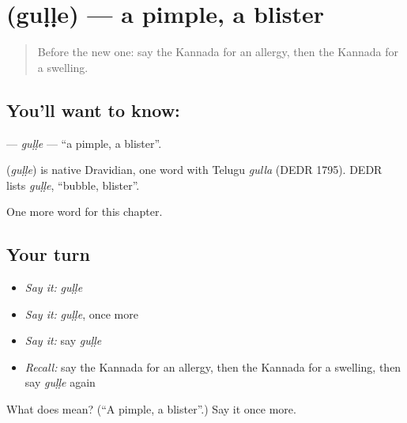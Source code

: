 \section[\texorpdfstring{\kn{ಗುಳ್ಳೆ} (guḷḷe)}{ಗುಳ್ಳೆ (guḷḷe)}]{ (guḷḷe) — a pimple, a blister}

\label{lesson:KA-C245-gulle}



\begin{quote}
Before the new one: say the Kannada for an allergy, then the Kannada for a swelling.
\end{quote}

\subsection*{You'll want to know: }
\textbf{} — \emph{guḷḷe} — \textquotedblleft{}a pimple, a blister\textquotedblright{}.

\begin{cousinweb}
\textbf{} (\emph{guḷḷe}) is native Dravidian, one word with Telugu \emph{gulla} (DEDR 1795). DEDR lists \emph{guḷḷe}, \textquotedblleft{}bubble, blister\textquotedblright{}.
\end{cousinweb}

\begin{grammarlens}[title={What you've built}]
One more word for this chapter.
\end{grammarlens}

\subsection*{Your turn}
\begin{itemize}
\raggedright
  \item \emph{Say it:} \emph{guḷḷe}
  \item \emph{Say it:} \emph{guḷḷe}, once more
  \item \emph{Say it:} say \emph{guḷḷe}
  \item \emph{Recall:} say the Kannada for an allergy, then the Kannada for a swelling, then say \emph{guḷḷe} again
\end{itemize}

\begin{tcolorbox}[breakable,colback=teal!4,colframe=teal!35!black,title={Before you move on}]
What does  mean? (\textquotedblleft{}A pimple, a blister\textquotedblright{}.) Say it once more.
\end{tcolorbox}
